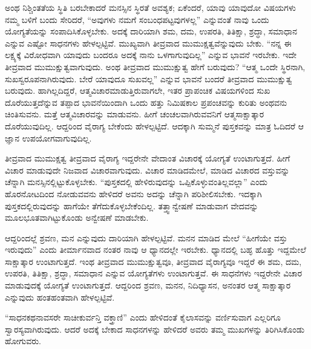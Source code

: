 ಅಂಥ ನಿಶ್ಚಿಂತತೆಯ ಸ್ಥಿತಿ ಬರಬೇಕಾದರೆ ಮನಸ್ಸಿನ ಸ್ಥಿರತೆ ಅವಶ್ಯಕ; ಏಕೆಂದರೆ, ಯಾವು ಯಾವುದೋ ವಿಷಯಗಳು ನಮ್ಮ ಬಳಿಗೆ ಬಂದು ಸೇರಿದರೆ, ``ಅವುಗಳು ನಮಗೆ ಸಂಬಂಧಪಟ್ಟವುಗಳಲ್ಲ'' ಎನ್ನುವಂತೆ ನಾವು ಒಂದು ಯೋಗ್ಯತೆಯನ್ನು ಸಂಪಾದಿಸಿಕೊಳ್ಳಬೇಕು. ಅದಕ್ಕೆ ದಾರಿಯಾಗಿ ಶಮ, ದಮ, ಉಪರತಿ, ತಿತಿಕ್ಷಾ, ಶ್ರದ್ಧಾ, ಸಮಾಧಾನ ಎನ್ನುವ ಎಷ್ಟೋ ಸಾಧನಗಳು ಹೇಳಲ್ಪಟ್ಟಿವೆ. ಮುಖ್ಯವಾಗಿ ತೀವ್ರವಾದ ಮುಮುಕ್ಷತ್ವವೆನ್ನುವುದು ಬೇಕು. ``ನನ್ನ ಈ ಲಕ್ಷ್ಯಕ್ಕೆ ವಿರೋಧವಾಗಿ ಯಾವುದು ಬಂದರೂ ಅದಕ್ಕೆ ನಾನು ಒಳಗಾಗುವುದಿಲ್ಲ'' ಎನ್ನುವ ಭಾವನೆ ಇರಬೇಕು. ಇದೇ ತೀವ್ರವಾದ ಮುಮುಕ್ಷುತ್ವವಾಗುವುದು. ಅಂಥ ತೀವ್ರವಾದ ಮುಮುಕ್ಷುತ್ವ ಹೇಗೆ ಬರುವುದು? ``ಆತ್ಮ ಒಂದೇ ಸ್ಥಿರನಾಗಿ, ಸುಖಸ್ವರೂಪನಾಗಿರುವುದು. ಬೇರೆ ಯಾವುದೂ ಸುಖವಲ್ಲ'' ಎನ್ನುವ ಭಾವನೆ ಬಂದರೆ ತೀವ್ರವಾದ ಮುಮುಕ್ಷುತ್ವ ಬರುವುದು. ಹಾಗಿಲ್ಲದಿದ್ದರೆ, ಆತ್ಮವಿಚಾರಮಾಡುತ್ತಿರುವಾಗಲೇ, ಇತರ ಪ್ರಾಪಂಚಿಕ ವಿಷಯಗಳಿಂದ ಸುಖ ದೊರೆಯುತ್ತದೆನ್ನುವ ತಪ್ಪಾದ ಭಾವನೆಯಿಂದಾಗಿ ಒಂದು ಹತ್ತು ನಿಮಿಷಕಾಲ ಪ್ರಪಂಚವನ್ನು ಕುರಿತು ಅಂಥವನು ಚಿಂತಿಸುವನು. ಮತ್ತೆ ಆತ್ಮವಿಚಾರವನ್ನು ಮಾಡುವನು. ಹೀಗೆ ಚಂಚಲವಾಗಿರುವವನಿಗೆ ಆತ್ಮಸಾಕ್ಷಾತ್ಕಾರ ದೊರೆಯುವುದಿಲ್ಲ. ಆದ್ದರಿಂದ ವೈರಾಗ್ಯ ಬೇಕೆಂದು ಹೇಳಲ್ಪಟ್ಟಿದೆ. ಆದಕ್ಕಾಗಿ ಸುಮ್ಮನೆ ಪುಸ್ತಕವನ್ನು ಮಾತ್ರ ಓದಿದರೆ ಆ ಜ್ಞಾನ ಉಪಯೋಗವಾಗುವುದಿಲ್ಲ.

ತೀವ್ರವಾದ ಮುಮುಕ್ಷತ್ವ ತೀವ್ರವಾದ ವೈರಾಗ್ಯ ಇದ್ದರೇನೇ ವೇದಾಂತ ವಿಚಾರಕ್ಕೆ ಯೋಗ್ಯತೆ ಉಂಟಾಗುತ್ತದೆ. ಹೀಗೆ ವಿಚಾರ ಮಾಡುವುದೇ ನಿಜವಾದ ವಿಚಾರವಾಗುವುದು. ವಿಚಾರ ಮಾಡಿದಮೇಲೆ, ಮಾಡಿದ ವಿಚಾರದ ವಸ್ತುವನ್ನು ಚೆನ್ನಾಗಿ ಮನಸ್ಸಿನಲ್ಲಿಟ್ಟುಕೊಳ್ಳಬೇಕು. ``ಪುಸ್ತಕದಲ್ಲಿ ಹೇಳಿರುವುದನ್ನು ಒಪ್ಪಿಕೊಳ್ಳುವಂತಿಲ್ಲವಲ್ಲಾ'' ಎಂದು ಹೊರನೋಟದಿಂದ ನೋಡುವವನು ಹೇಳಿದರೆ ಅವನು ಅದನ್ನು ಚೆನ್ನಾಗಿ ಪರಿಶೀಲಿಸಬೇಕು. ಇದಕ್ಕಾಗಿ ಪುಸ್ತಕದಲ್ಲಿರುವುದನ್ನು ಹಾಗೆಯೇ ತೆಗೆದುಕೊಳ್ಳಬೇಕೆಂದಿಲ್ಲ. ತತ್ತ್ವಾನ್ವೇಷಣೆ ಮಾಡುವಾಗ ವೇದವನ್ನು ಮೂಲಭೂತವಾಗಿಟ್ಟುಕೊಂಡು ಅನ್ವೇಷಣೆ ಮಾಡಬೇಕು.

ಆದ್ದರಿಂದಲ್ಲೆ ಶ್ರವಣ, ಮನ ಎನ್ನುವುದು ದಾರಿಯಾಗಿ ಹೇಳಲ್ಪಟ್ಟಿವೆ. ಮನನ ಮಾಡಿದ ಮೇಲೆ ``ಹೀಗೆಯೇ ವಸ್ತು ಇರುವುದು'' ಎಂದು ತೀರ್ಮಾನವಾದ ನಂತರ ನಾವು ಆ ಧ್ಯಾನದಲ್ಲೇ ಇರಬೇಕು. ಧ್ಯಾನದಲ್ಲಿ ಬಹ್ಳ ಹೊತ್ತು ಇದ್ದಮೇಲೆ ಸಾಕ್ಷಾತ್ಕಾರ ಉಂಟಾಗುತ್ತದೆ. ಇಂಥ ತೀವ್ರವಾದ ಮುಮುಕ್ಷುತ್ವವೂ, ತೀವ್ರವಾದ ವೈರಾಗ್ಯವೂ ಇದ್ದರೆ ಈ ಶಮ, ದಮ, ಉಪರತಿ, ತಿತಿಕ್ಷಾ, ಶ್ರದ್ಧಾ, ಸಮಾಧಾನ ಎನ್ನುವ ಯೋಗ್ಯತೆಗಳು ಉಂಟಾಗುತ್ತವೆ. ಈ ಸಾಧನೆಗಳು ಇದ್ದರೇನೇ ವಿಚಾರ ಮಾಡುವುದಕ್ಕೆ ಯೋಗ್ಯತೆ ಉಂಟಾಗುತ್ತದೆ. ಆದ್ದರಿಂದ ಶ್ರವಣ, ಮನನ, ನಿದಿಧ್ಯಾಸನ, ಅನಂತರ ಆತ್ಮ ಸಾಕ್ಷಾತ್ಕಾರ ಎನ್ನುವುದು ಹಂತಹಂತವಾಗಿ ಹೇಳಲ್ಪಟ್ಟಿವೆ.

``ಸಾಧನಕಥನಾವಸರೇ ಸಾಚೀಕುರ್ವನ್ತಿ ವಕ್ತ್ರಾಣಿ'' ಎಂದು ಹೇಳಿದಂತೆ ಕೈಲಾಸವನ್ನು ವರ್ಣಿಸುವಾಗ ಎಲ್ಲರಿಗೂ ಸ್ವಾರಸ್ಯವಾಗಿರುವುದು. ಆದರೆ ಅದಕ್ಕೆ ಬೇಕಾದ ಸಾಧನಗಳನ್ನು ಹೇಳಿದರೆ ಅವರು ತಮ್ಮ ಮುಖಗಳನ್ನು ತಿರಿಗಿಸಿಕೊಂಡು ಹೋಗುವರು.

